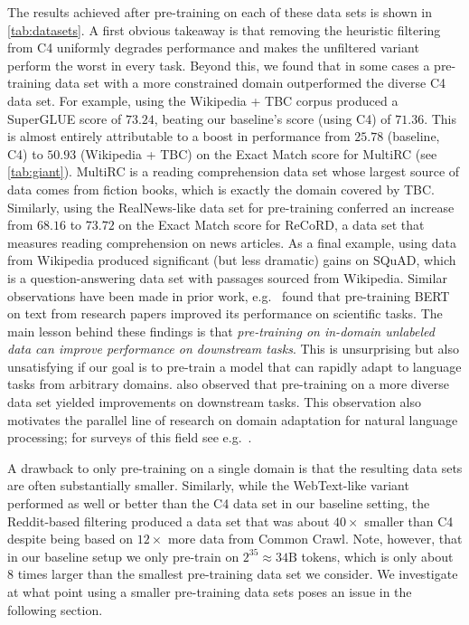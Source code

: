 \documentclass[twoside,11pt]{article}
\begin{document}
The results achieved after pre-training on each of these data sets is shown in \cref{tab:datasets}.
A first obvious takeaway is that removing the heuristic filtering from C4 uniformly degrades performance and makes the unfiltered variant perform the worst in every task.
Beyond this, we found that in some cases a pre-training data set with a more constrained domain outperformed the diverse C4 data set.
For example, using the Wikipedia + TBC corpus produced a SuperGLUE score of $73.24$, beating our baseline's score (using C4) of $71.36$.
This is almost entirely attributable to a boost in performance from $25.78$ (baseline, C4) to $50.93$ (Wikipedia + TBC) on the Exact Match score for MultiRC (see \cref{tab:giant}).
MultiRC is a reading comprehension data set whose largest source of data comes from fiction books, which is exactly the domain covered by TBC.
Similarly, using the RealNews-like data set for pre-training conferred an increase from $68.16$ to $73.72$ on the Exact Match score for ReCoRD, a data set that measures reading comprehension on news articles.
As a final example, using data from Wikipedia produced significant (but less dramatic) gains on SQuAD, which is a question-answering data set with passages sourced from Wikipedia.
Similar observations have been made in prior work, e.g.\ \citet{beltagy2019scibert} found that pre-training BERT on text from research papers improved its performance on scientific tasks.
The main lesson behind these findings is that \textit{pre-training on in-domain unlabeled data can improve performance on downstream tasks}.
This is unsurprising but also unsatisfying if our goal is to pre-train a model that can rapidly adapt to language tasks from arbitrary domains.
\citet{liu2019roberta} also observed that pre-training on a more diverse data set yielded improvements on downstream tasks.
This observation also motivates the parallel line of research on domain adaptation for natural language processing; for surveys of this field see e.g.\ \cite{ruder2019neural,li2012literature}.

A drawback to only pre-training on a single domain is that the resulting data sets are often substantially smaller.
Similarly, while the WebText-like variant performed as well or better than the C4 data set in our baseline setting, the Reddit-based filtering produced a data set that was about $40\times$ smaller than C4 despite being based on $12\times$ more data from Common Crawl.
Note, however, that in our baseline setup we only pre-train on $2^{35} \approx 34\mathrm{B}$ tokens, which is only about $8$ times larger than the smallest pre-training data set we consider.
We investigate at what point using a smaller pre-training data sets poses an issue in the following section.
\end{document}
